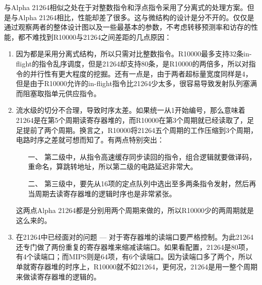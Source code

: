 与Alpha 21264相似之处在于对整数指令和浮点指令采用了分离式的处理方案。但是与Alpha 21264相比，性能却差了很多。这与微结构的设计是分不开的。仅仅是通过观察两者的整体设计图以及一些最基本的参数，不考虑转移预测率和访存的性能，都不难找到R10000与21264之间差距的几点原因：
\begin{enumerate}[label=(\alph*)]
	\item 因为都是采用分离式结构，所以只需对比整数指令。R10000最多支持32条in-flight的指令乱序调度，但是21264却支持80条，是R10000的两倍多，所以对指令的并行性有更大程度的挖掘。还有一点是，由于两者超标量宽度同样是4，但是由于R10000允许的in-flight指令比21264少太多，很容易导致发射队列塞满而阻塞取指单元供应指令。
	\item 流水级的切分不合理，导致时序太差。如果统一从1开始编号，那么意味着21264是在第5个周期读寄存器堆的，而R10000在第3个周期就已经读取了，足足提前了两个周期。换言之，R10000将21264五个周期的工作压缩到3个周期，电路时序之差就可想而知了。有两点特别突出：
	\begin{enumerate}
		\item[一、] 第二级中，从指令高速缓存同步读回的指令，组合逻辑就要做译码，重命名，算跳转地址，所以第二级的电路延迟非常大。
		\item[二、] 第三级中，要先从16项的定点队列中选出至多两条指令发射，然后再当周期去读寄存器堆的逻辑时序也是非常紧张。
	\end{enumerate}

	这两点Alpha 21264都是分别用两个周期来做的，所以R10000少的两周期就是这么来的。
	\item 在21264中已经面对的问题 --- 对于寄存器堆的读端口要严格控制。为此21264还专门做了两份重复的寄存器堆来缩减读端口。如果看配置，21264是80项，有4个读端口；而MIPS则是64项，有6个读端口。因为读端口多了两个，所以单就寄存器堆的时序上，R10000就不如21264，更何况，21264是用一整个周期来做读寄存器堆的逻辑的。
\end{enumerate}

